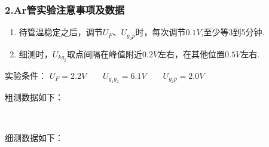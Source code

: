 \documentclass[12pt,a4paper,UTF8]{ctexart}
\begin{document}
\subsubsection*{2.Ar管实验注意事项及数据}
\begin{enumerate}[(1)]
	\item 待管温稳定之后，调节$U_F、U_{g_2p}$时，每次调节$0.1V$,至少等3到5分钟.
	\item 细测时，$U_{kg_2}$取点间隔在峰值附近$0.2V$左右，在其他位置$0.5V$左右.
	\end{enumerate}
	\par
	实验条件：
	$U_F=2.2V\qquad	U_{g_1g_2}=6.1V\qquad U_{g_{2}p}=2.0V\qquad $ 
	\par
	粗测数据如下：
	\begin{table}[htbp]	
	\centering
	\end{table}
	~\\
	\par
	细测数据如下：
\end{document}
